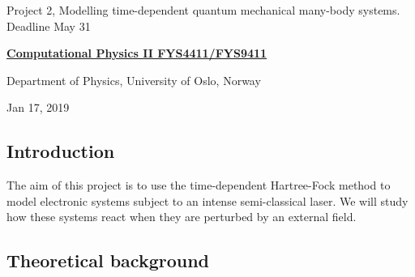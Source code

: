 \documentclass[%
oneside,                 %
final,                   %
10pt]{article}
\begin{document}

\newcommand{\exercisesection}[1]{\subsection*{#1}}






\thispagestyle{empty}

\begin{center}
{\LARGE\bf
\begin{spacing}{1.25}
Project 2, Modelling time-dependent quantum mechanical many-body systems. Deadline May 31
\end{spacing}
}
\end{center}


\begin{center}
{\bf \href{{http://www.uio.no/studier/emner/matnat/fys/FYS4411/index-eng.html}}{Computational Physics II FYS4411/FYS9411}}
\end{center}

    \begin{center}
\centerline{{\small Department of Physics, University of Oslo, Norway}}
\end{center}
    

\begin{center}
Jan 17, 2019
\end{center}

\vspace{1cm}


\subsection{Introduction}

The aim of this project is to use the time-dependent Hartree-Fock method to
model electronic systems subject to an intense semi-classical laser. We will
study how these systems react when they are perturbed by an external field.


\subsection{Theoretical background}
\end{document}
